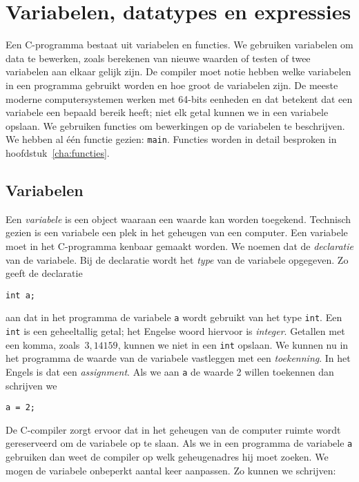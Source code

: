 \chapter{Variabelen, datatypes en expressies}
\label{cha:vardatexp}
\thispagestyle{empty}

Een C-programma bestaat uit variabelen en functies. We gebruiken variabelen om data te bewerken, zoals berekenen van nieuwe waarden of testen of twee variabelen aan elkaar gelijk zijn. De compiler moet notie hebben welke variabelen in een programma gebruikt worden en hoe groot de variabelen zijn. De meeste moderne computersystemen werken met 64-bits eenheden en dat betekent dat een variabele een bepaald bereik heeft; niet elk getal kunnen we in een variabele opslaan.
We gebruiken functies om bewerkingen op de variabelen te beschrijven. We hebben al één functie gezien: \texttt{main}. Functies worden in detail besproken in hoofdstuk~\ref{cha:functies}.


\section{Variabelen}
Een \textsl{variabele} is een object waaraan een waarde kan worden toegekend. Technisch gezien is een variabele een plek in het geheugen van een computer. Een variabele moet in het C-programma kenbaar gemaakt worden. We noemen dat de \textsl{declaratie} van de variabele. Bij de declaratie wordt het \textsl{type} van de variabele opgegeven. Zo geeft de declaratie

\hspace*{1em}\texttt{int a;}

aan dat in het programma de variabele \texttt{a} wordt gebruikt van het type \texttt{int}. Een \texttt{int} is een geheeltallig getal; het Engelse woord hiervoor is \textsl{integer}. Getallen met een komma, zoals~$3,14159$, kunnen we niet in een \texttt{int} opslaan. We kunnen nu in het programma de waarde van de variabele vastleggen met een \textsl{toekenning}. In het Engels is dat een \textsl{assignment}. Als we aan \texttt{a} de waarde 2 willen toekennen dan schrijven we

\hspace*{1em}\texttt{a = 2;}

De C-compiler zorgt ervoor dat in het geheugen van de computer ruimte wordt gereserveerd om de variabele op te slaan. Als we in een programma de variabele \texttt{a} gebruiken dan weet de compiler op welk geheugenadres hij moet zoeken. We mogen de variabele onbeperkt aantal keer aanpassen. Zo kunnen we schrijven:


